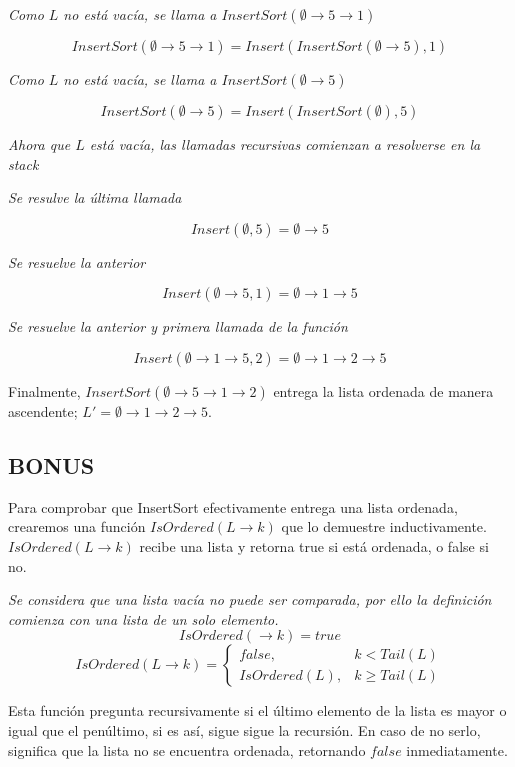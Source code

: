 \documentclass[../doc.tex]{subfiles}
\begin{document}
\emph{Como $L$ no está vacía, se llama a $InsertSort(\emptyset \rightarrow 5 \rightarrow 1)$}

\[InsertSort(\emptyset \rightarrow 5 \rightarrow 1) = Insert(InsertSort(\emptyset \rightarrow 5),1) \]

\emph{Como $L$ no está vacía, se llama a $InsertSort(\emptyset \rightarrow 5)$}

\[InsertSort(\emptyset \rightarrow 5) = Insert(InsertSort(\emptyset),5) \]

\emph{Ahora que $L$ está vacía, las llamadas recursivas comienzan a resolverse en la stack}

\emph{Se resulve la última llamada}

\[Insert(\emptyset,5) = \emptyset \rightarrow 5\]

\emph{Se resuelve la anterior}

\[Insert(\emptyset \rightarrow 5,1) = \emptyset \rightarrow 1 \rightarrow 5\]

\emph{Se resuelve la anterior y primera llamada de la función}

\[Insert(\emptyset \rightarrow 1 \rightarrow 5,2) = \emptyset \rightarrow 1 \rightarrow 2 \rightarrow 5\]

Finalmente, $InsertSort(\emptyset \rightarrow 5 \rightarrow 1 \rightarrow 2)$ entrega la lista ordenada de manera ascendente; $L' = \emptyset \rightarrow 1 \rightarrow 2 \rightarrow 5$. 

\subsection{BONUS}
Para comprobar que InsertSort efectivamente entrega una lista ordenada,
crearemos una función $IsOrdered(L \rightarrow k)$ que lo demuestre inductivamente.
$IsOrdered(L \rightarrow k)$ recibe una lista y retorna true si está ordenada, o false si no.

\textit{
Se considera que una lista vacía no puede ser comparada, por ello la definición comienza con una lista de un solo elemento.}
\[IsOrdered(\rightarrow k) = true\]
\[IsOrdered(L \rightarrow k) =
\left\{
\begin{array}{lr}
  false, & k < Tail(L)\\
  IsOrdered(L), & k \ge Tail(L)
\end{array} \right .\]

Esta función pregunta recursivamente si el último elemento de la lista es mayor 
o igual que el penúltimo, si es así, sigue sigue la recursión. En caso de no 
serlo, significa que la lista no se encuentra ordenada, retornando $false$ 
inmediatamente.
\end{document}
